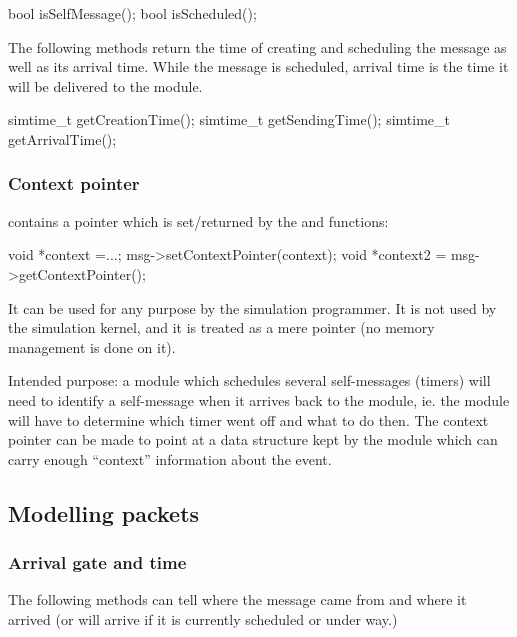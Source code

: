 \begin{cpp}
bool isSelfMessage();
bool isScheduled();
\end{cpp}

The following methods return the time of creating and scheduling the message
as well as its arrival time. While the message is scheduled, arrival
time is the time it will be delivered to the module.

\begin{cpp}
simtime_t getCreationTime();
simtime_t getSendingTime();
simtime_t getArrivalTime();
\end{cpp}

\subsubsection{Context pointer}

 contains a  pointer which is
set/returned by the  and
 functions:

\begin{cpp}
void *context =...;
msg->setContextPointer(context);
void *context2 = msg->getContextPointer();
\end{cpp}


It can be used for any purpose by the simulation programmer.
It is not used by the simulation kernel, and it is treated as
a mere pointer (no memory management is done on it).

Intended purpose: a module which schedules several self-messages
(timers) will need to identify a self-message when it arrives back to
the module, ie. the module will have to determine which timer went off
and what to do then. The context pointer can be
made to point at a data structure kept by the module which can carry
enough ``context'' information about the event.



\subsection{Modelling packets}

\subsubsection{Arrival gate and time}

The following methods can tell where the message came from and
where it arrived (or will arrive if it is currently scheduled or under way.)

